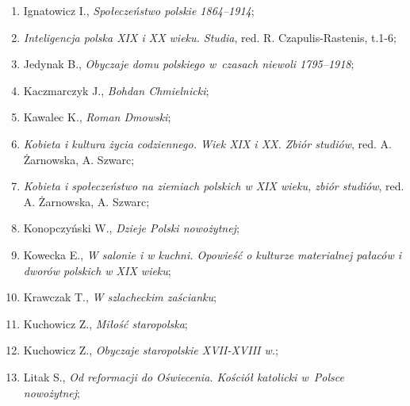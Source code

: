 \documentclass[a4paper,11pt]{article}
\begin{document}
\begin{enumerate}
\item Ignatowicz I., \textit{Społeczeństwo polskie 1864--1914};



\item \textit{Inteligencja polska XIX i XX wieku. Studia}, red. R.
  Czapulis-Rastenis, t.1-6;



\item Jedynak B., \textit{Obyczaje domu polskiego w~czasach niewoli
    1795--1918};



\item Kaczmarczyk J., \textit{Bohdan Chmielnicki};



\item Kawalec K., \textit{Roman Dmowski};



\item \textit{Kobieta i kultura życia codziennego. Wiek XIX i XX. Zbiór
    studiów}, red. A. Żarnowska, A. Szwarc;



\item \textit{Kobieta i społeczeństwo na ziemiach polskich w XIX wieku,
    zbiór studiów}, red. A. Żarnowska, A. Szwarc;



\item Konopczyński W., \textit{Dzieje Polski nowożytnej};



\item Kowecka E., \textit{W salonie i w kuchni. Opowieść o kulturze
    materialnej pałaców i dworów polskich w XIX wieku};



\item Krawczak T., \textit{W szlacheckim zaścianku};



\item Kuchowicz Z., \textit{Miłość staropolska};



\item Kuchowicz Z., \textit{Obyczaje staropolskie XVII-XVIII w.};



\item Litak S., \textit{Od reformacji do Oświecenia. Kościół katolicki
    w~Polsce nowożytnej};




\end{enumerate}
\end{document}
